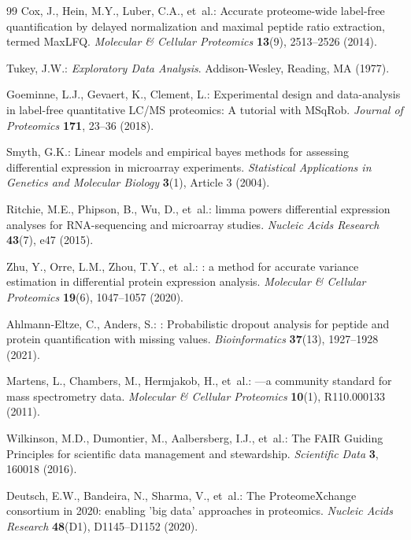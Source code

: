 \documentclass[11pt,twoside,openright]{book}
\begin{document}
\begin{thebibliography}{99}
Cox, J., Hein, M.Y., Luber, C.A., et~al.:
\newblock Accurate proteome-wide label-free quantification by delayed normalization and maximal peptide ratio extraction, termed {MaxLFQ}.
\newblock \emph{Molecular \& Cellular Proteomics} \textbf{13}(9), 2513--2526 (2014).
\newblock {}

Tukey, J.W.:
\newblock \emph{Exploratory Data Analysis}.
\newblock Addison-Wesley, Reading, MA (1977).

Goeminne, L.J., Gevaert, K., Clement, L.:
\newblock Experimental design and data-analysis in label-free quantitative {LC/MS} proteomics: A tutorial with {MSqRob}.
\newblock \emph{Journal of Proteomics} \textbf{171}, 23--36 (2018).
\newblock {}

Smyth, G.K.:
\newblock Linear models and empirical bayes methods for assessing differential expression in microarray experiments.
\newblock \emph{Statistical Applications in Genetics and Molecular Biology} \textbf{3}(1), Article 3 (2004).
\newblock {}

Ritchie, M.E., Phipson, B., Wu, D., et~al.:
\newblock limma powers differential expression analyses for {RNA}-sequencing and microarray studies.
\newblock \emph{Nucleic Acids Research} \textbf{43}(7), e47 (2015).
\newblock {}

Zhu, Y., Orre, L.M., Zhou, T.Y., et~al.:
: a method for accurate variance estimation in differential protein expression analysis.
\newblock \emph{Molecular \& Cellular Proteomics} \textbf{19}(6), 1047--1057 (2020).
\newblock {}

Ahlmann-Eltze, C., Anders, S.:
: Probabilistic dropout analysis for peptide and protein quantification with missing values.
\newblock \emph{Bioinformatics} \textbf{37}(13), 1927--1928 (2021).
\newblock {}

Martens, L., Chambers, M., Hermjakob, H., et~al.:
---a community standard for mass spectrometry data.
\newblock \emph{Molecular \& Cellular Proteomics} \textbf{10}(1), R110.000133 (2011).
\newblock {}

Wilkinson, M.D., Dumontier, M., Aalbersberg, I.J., et~al.:
\newblock The {FAIR} Guiding Principles for scientific data management and stewardship.
\newblock \emph{Scientific Data} \textbf{3}, 160018 (2016).
\newblock {}

Deutsch, E.W., Bandeira, N., Sharma, V., et~al.:
\newblock The {ProteomeXchange} consortium in 2020: enabling 'big data' approaches in proteomics.
\newblock \emph{Nucleic Acids Research} \textbf{48}(D1), D1145--D1152 (2020).
\newblock {}

\end{thebibliography}
\end{document}
